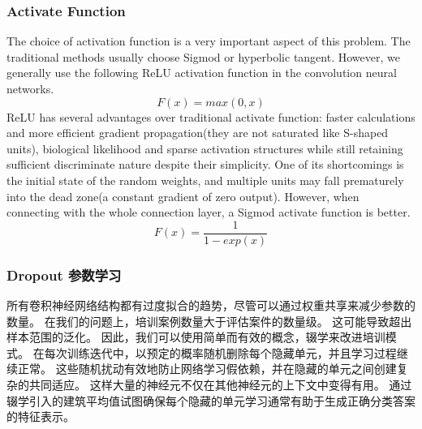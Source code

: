 \subsubsection{Activate Function}
The choice of activation function is a very important aspect of this problem. The traditional methods usually choose Sigmod or hyperbolic tangent. However, we generally use the following ReLU activation function in the convolution neural networks.
\begin{equation}
F(x) = max (0, x)
\end{equation}
ReLU has several advantages over traditional activate function: faster calculations and more efficient gradient propagation(they are not saturated like S-shaped units), biological likelihood and sparse activation structures while still retaining sufficient discriminate nature despite their simplicity. One of its shortcomings is the initial state of the random weights, and multiple units may fall prematurely into the dead zone(a constant gradient of zero output). However, when connecting with the whole connection layer, a Sigmod activate function is better.
\begin{equation}
F(x) = \frac{1}{1-exp(x)}
\end{equation}

\subsubsection{Dropout 参数学习}
所有卷积神经网络结构都有过度拟合的趋势，尽管可以通过权重共享来减少参数的数量。 在我们的问题上，培训案例数量大于评估案件的数量级。 这可能导致超出样本范围的泛化。 因此，我们可以使用简单而有效的概念，辍学来改进培训模式。 在每次训练迭代中，以预定的概率随机删除每个隐藏单元，并且学习过程继续正常。 这些随机扰动有效地防止网络学习假依赖，并在隐藏的单元之间创建复杂的共同适应。 这样大量的神经元不仅在其他神经元的上下文中变得有用。 通过辍学引入的建筑平均值试图确保每个隐藏的单元学习通常有助于生成正确分类答案的特征表示。

